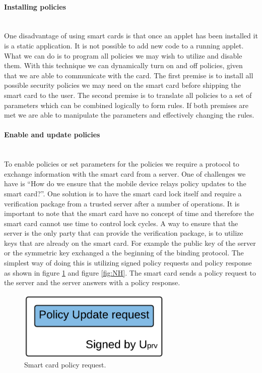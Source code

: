 \paragraph{Installing policies}\mbox{}\\
One disadvantage of using smart cards is that once an applet has been installed it is a static application. It is not possible to add new code to a running applet. What we can do is to program all policies we may wish to utilize and disable them. With this technique we can dynamically turn on and off policies, given that we are able to communicate with the card. The first premise is to install all possible security policies we may need on the smart card before shipping the smart card to the user. The second premise is to translate all policies to a set of parameters which can be combined logically to form rules. If both premises are met we are able to manipulate the parameters and effectively changing the rules.

\paragraph{Enable and update policies}\mbox{}\\
To enable policies or set parameters for the policies we require a protocol to exchange information with the smart card from a server. One of challenges we have is ``How do we ensure that the mobile device relays policy updates to the smart card?''. One solution is to have the smart card lock itself and require a verification package from a trusted server after a number of operations. It is important to note that the smart card have no concept of time and therefore the smart card cannot use time to control lock cycles. A way to ensure that the server is the only party that can provide the verification package, is to utilize keys that are already on the smart card. For example the public key of the server or the symmetric key exchanged a the beginning of the binding protocol. The simplest way of doing this is utilizing signed policy requests and policy response as shown in figure \ref{fig:OH} and figure \ref{fig:NH}. The smart card sends a policy request to the server and the server answers with a policy response.

\begin{figure}[h!]
  \captionsetup{justification=centering,margin=1.5cm}
  \caption{Smart card policy request.}
  \label{fig:OH}
  \centering
    \includegraphics[width=0.65\textwidth]{images/challenge.png}
\end{figure}

